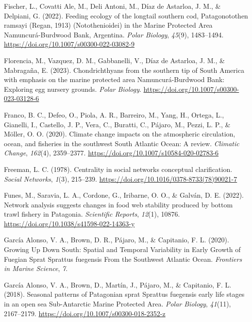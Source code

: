\documentclass[preprint, 3p,
authoryear]{elsarticle} %
\newlength{\cslhangindent}
\newlength{\cslentryspacingunit} %
\newenvironment{CSLReferences}[2] %
 {%
  \setlength{\parindent}{0pt}
  \ifodd #1
  \let\oldpar\par
  \def\par{\hangindent=\cslhangindent\oldpar}
  \fi
  \setlength{\parskip}{#2\cslentryspacingunit}
 }%
 {}
\begin{document}
\begin{CSLReferences}{1}{0}
\leavevmode{}%
Fischer, L., Covatti Ale, M., Deli Antoni, M., Díaz de Astarloa, J. M.,
\& Delpiani, G. (2022). Feeding ecology of the longtail southern cod,
{Patagonotothen} ramsayi ({Regan}, 1913) ({Notothenioidei}) in the
{Marine Protected Area Namuncurá-Burdwood Bank}, {Argentina}.
\emph{Polar Biology}, \emph{45}(9), 1483--1494.
\url{https://doi.org/10.1007/s00300-022-03082-9}

\leavevmode{}%
Florencia, M., Vazquez, D. M., Gabbanelli, V., Díaz de Astarloa, J. M.,
\& Mabragaña, E. (2023). Chondrichthyans from the southern tip of {South
America} with emphasis on the marine protected area {Namuncurá-Burdwood
Bank}: Exploring egg nursery grounds. \emph{Polar Biology}.
\url{https://doi.org/10.1007/s00300-023-03128-6}

\leavevmode{}%
Franco, B. C., Defeo, O., Piola, A. R., Barreiro, M., Yang, H., Ortega,
L., Gianelli, I., Castello, J. P., Vera, C., Buratti, C., Pájaro, M.,
Pezzi, L. P., \& Möller, O. O. (2020). Climate change impacts on the
atmospheric circulation, ocean, and fisheries in the southwest {South
Atlantic Ocean}: A review. \emph{Climatic Change}, \emph{162}(4),
2359--2377. \url{https://doi.org/10.1007/s10584-020-02783-6}

\leavevmode{}%
Freeman, L. C. (1978). Centrality in social networks conceptual
clarification. \emph{Social Networks}, \emph{1}(3), 215--239.
\url{https://doi.org/10.1016/0378-8733(78)90021-7}

\leavevmode{}%
Funes, M., Saravia, L. A., Cordone, G., Iribarne, O. O., \& Galván, D.
E. (2022). Network analysis suggests changes in food web stability
produced by bottom trawl fishery in {Patagonia}. \emph{Scientific
Reports}, \emph{12}(1), 10876.
\url{https://doi.org/10.1038/s41598-022-14363-y}

\leavevmode{}%
García Alonso, V. A., Brown, D. R., Pájaro, M., \& Capitanio, F. L.
(2020). Growing {Up Down South}: {Spatial} and {Temporal Variability} in
{Early Growth} of {Fuegian Sprat Sprattus} fuegensis {From} the
{Southwest Atlantic Ocean}. \emph{Frontiers in Marine Science},
\emph{7}.

\leavevmode{}%
García Alonso, V. A., Brown, D., Martín, J., Pájaro, M., \& Capitanio,
F. L. (2018). Seasonal patterns of {Patagonian} sprat {Sprattus}
fuegensis early life stages in an open sea {Sub-Antarctic Marine
Protected Area}. \emph{Polar Biology}, \emph{41}(11), 2167--2179.
\url{https://doi.org/10.1007/s00300-018-2352-z}


\end{CSLReferences}
\end{document}
